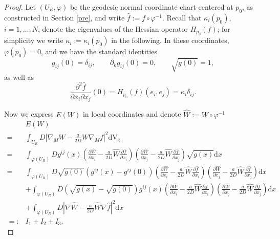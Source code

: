 \documentclass[12pt,reqno]{amsart}
\newcommand{\V}{\mathrm{d} \mathrm{V_g}}
\numberwithin{equation}{section}
\begin{document}
\begin{proof}
Let \((U_R,\varphi)\) be the geodesic normal coordinate chart centered at \(p_0\), as constructed in Section \ref{pre}, and write \(\hat f:=f\circ\varphi^{-1}\). Recall that \(\kappa_i(p_0)\), \(i=1,\dots,N\), denote the eigenvalues of the Hessian operator \(H_{p_0}(f)\); for simplicity we write \(\kappa_i:=\kappa_i(p_0)\) in the following. In these coordinates, \(\varphi(p_0)=0\), and we have the standard identities
\[
g_{ij}(0)=\delta_{ij},\qquad \partial_k g_{ij}(0)=0,\qquad \sqrt{g(0)}=1,
\]
as well as
\begin{equation}\label{hessij-local}
\frac{\partial^2 \hat f}{\partial x_i \partial x_j}(0)
=
H_{p_0}(f)(e_i,e_j)
=
\kappa_i \delta_{ij}.
\end{equation}


Now we express \(E(W)\) in local coordinates and denote $\hat W:=W\circ\varphi^{-1}$
\begin{align*}
 & E (W) \\
    = & 
\int_{U_R} D \left| \nabla_M W - \frac{a}{2D} W \nabla_M f
  \right|^2 \V  \nonumber\\
 =& \int_{\varphi(U_R)}  D g^{ij}(x)(\frac{\partial \hat{W}}{\partial x_i} -\frac{a}{2 D} \hat{W}\frac{\partial \hat{f}}{\partial x_i} )(\frac{\partial \hat{W}}{\partial x_j} -\frac{a}{2 D} \hat{W}\frac{\partial \hat{f}}{\partial x_j} )
 \sqrt{g(x)}\mathrm{d} x\nonumber\\
 = &  
 \int_{\varphi(U_R)} D \sqrt{g(0)}  (g^{i j} (x) - g^{i j} (0)) 
  \left( \frac{\partial \hat{W}}{\partial x_i} - \frac{a}{2D} \hat{W} \frac{\partial
  \hat{f}}{\partial x_i} \right)  \left( \frac{\partial \hat{W}}{\partial x_j} -  \frac{a}{2D} \hat{W} \frac{\partial \hat{f}}{\partial x_j} \right)  \mathrm{d} x
  \nonumber\\
  & + \int_{\varphi(U_R)} D \left( \sqrt{g(x)}  - \sqrt{g(0)}  \right) g^{i j} (x) \left( \frac{\partial \hat{W}}{\partial x_i} -
  \frac{a}{2D} \hat{W} \frac{\partial \hat{f}}{\partial x_i} \right)  \left(
  \frac{\partial \hat{W}}{\partial x_j} - \frac{a}{2D} \hat{W} \frac{\partial
  \hat{f}}{\partial x_j} \right)  \mathrm{d} x \nonumber\\
  &+  \int_{\varphi(U_R)} D  \left| \nabla \hat{W} - \frac{a}{2D} \hat{W} \nabla \hat{f}   \right|^2 \mathrm{d} x  \nonumber\\ 
=: &I_1+I_2+I_3. 
\end{align*}

\end{proof}
\end{document}
